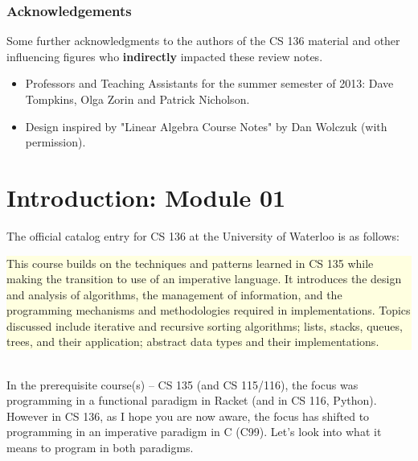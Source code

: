 \documentclass[11pt, twoside, exarticle]{article}
\newcommand{\defnbox}[2] {
	\setlength{\fboxsep}{8pt}
	\marginpar {
		\vspace{0.9em}
		\footnotesize{\textbf{\color{brown}DEFINITION}}
		\begin{center}
		\footnotesize{\textbf{#1}}
		\end{center}
	}
	\colorbox{lightyellow}{
		\begin{varwidth}{\dimexpr\linewidth-2\fboxsep}
		#2
		\end{varwidth}
	}
	~\\
}
\begin{document}
\subsubsection*{Acknowledgements}

Some further acknowledgments to the authors of the CS 136 material and other influencing figures who \textbf{indirectly} impacted these review notes.

\begin{itemize}

\item Professors and Teaching Assistants for the summer semester of 2013: Dave Tompkins, Olga Zorin and Patrick Nicholson.
\item Design inspired by "Linear Algebra Course Notes" by Dan Wolczuk (with permission).

\end{itemize}

\clearpage
\thispagestyle{empty}
\tableofcontents

\clearpage


\setlength{\oddsidemargin}{1.6cm}
\setlength{\evensidemargin}{\oddsidemargin}
\setlength{\marginparwidth}{2.6cm}
\setlength{\marginparsep}{0.25cm}

\section{Introduction: Module 01}

The official catalog entry for CS 136 at the University of Waterloo is as follows:\\

\defnbox{CS 136}{This course builds on the techniques and
patterns learned in CS 135 while making the transition to use of an
imperative language. It introduces the design and analysis of
algorithms, the management of information, and the programming
mechanisms and methodologies required in implementations.
Topics discussed include iterative and recursive sorting algorithms;
lists, stacks, queues, trees, and their application; abstract data types
and their implementations.}

In the prerequisite course(s) -- CS 135 (and CS 115/116), the focus was programming in a functional paradigm in Racket (and in CS 116, Python). However in CS 136, as I hope you are now aware, the focus has shifted to programming in an imperative paradigm in C (C99). Let's look into what it means to program in both paradigms.\\
\end{document}
